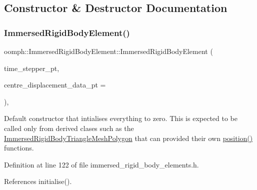 \subsection{Constructor \& Destructor Documentation}
\mbox{\label{classoomph_1_1ImmersedRigidBodyElement_a085973f0fc1fe69839a632811ea8702b}} 
\subsubsection{\texorpdfstring{Immersed\+Rigid\+Body\+Element()}{ImmersedRigidBodyElement()}\hspace{0.1cm}{\footnotesize\ttfamily [1/2]}}
{\footnotesize\ttfamily oomph\+::\+Immersed\+Rigid\+Body\+Element\+::\+Immersed\+Rigid\+Body\+Element (\begin{DoxyParamCaption}\item[{\hyperlink{classoomph_1_1TimeStepper}{Time\+Stepper} $\ast$const \&}]{time\+\_\+stepper\+\_\+pt,  }\item[{\hyperlink{classoomph_1_1Data}{Data} $\ast$const \&}]{centre\+\_\+displacement\+\_\+data\+\_\+pt = {} }\end{DoxyParamCaption})\hspace{0.3cm}{\ttfamily [inline]}, {\ttfamily [protected]}}



Default constructor that intialises everything to zero. This is expected to be called only from derived clases such as the \hyperlink{classoomph_1_1ImmersedRigidBodyTriangleMeshPolygon}{Immersed\+Rigid\+Body\+Triangle\+Mesh\+Polygon} that can provided their own \hyperlink{classoomph_1_1ImmersedRigidBodyElement_a14f5acb186ecd1168dfa08dcf242c538}{position()} functions. 



Definition at line 122 of file immersed\+\_\+rigid\+\_\+body\+\_\+elements.\+h.



References initialise().

\mbox{\label{classoomph_1_1ImmersedRigidBodyElement_ada7e9e80771ed9df5f236b371ca66f84}} 
